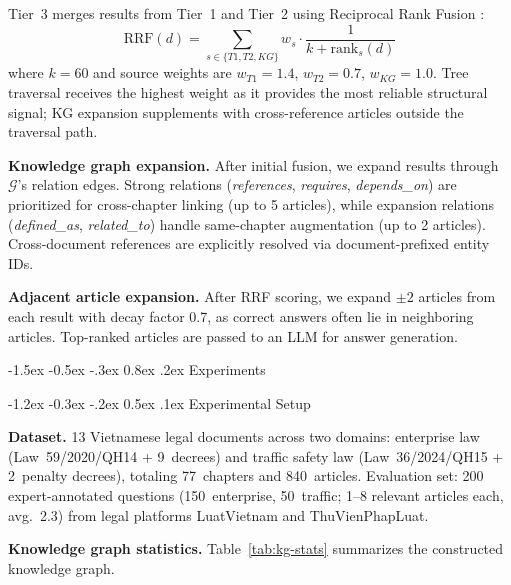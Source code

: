 \documentclass{IOS-Book-Article}
\makeatletter
\renewcommand\section{\@startsection{section}{1}{\z@}%
  {-1.5ex \@plus -0.5ex \@minus -.3ex}%
  {0.8ex \@plus .2ex}%
  {\normalfont\large\bfseries}}
\renewcommand\subsection{\@startsection{subsection}{2}{\z@}%
  {-1.2ex \@plus -0.3ex \@minus -.2ex}%
  {0.5ex \@plus .1ex}%
  {\normalfont\normalsize\bfseries}}
\makeatother
\begin{document}
Tier~3 merges results from Tier~1 and Tier~2 using Reciprocal Rank Fusion \cite{r28}:
\begin{equation}
\text{RRF}(d) = \sum_{s \in \{T1, T2, KG\}} w_s \cdot \frac{1}{k + \text{rank}_s(d)}
\end{equation}
where $k=60$ and source weights are $w_{T1}=1.4$, $w_{T2}=0.7$, $w_{KG}=1.0$. Tree traversal receives the highest weight as it provides the most reliable structural signal; KG expansion supplements with cross-reference articles outside the traversal path.

\textbf{Knowledge graph expansion.} After initial fusion, we expand results through $\mathcal{G}$'s relation edges. Strong relations (\textit{references}, \textit{requires}, \textit{depends\_on}) are prioritized for cross-chapter linking (up to 5 articles), while expansion relations (\textit{defined\_as}, \textit{related\_to}) handle same-chapter augmentation (up to 2 articles). Cross-document references are explicitly resolved via document-prefixed entity IDs.

\textbf{Adjacent article expansion.} After RRF scoring, we expand $\pm 2$ articles from each result with decay factor 0.7, as correct answers often lie in neighboring articles. Top-ranked articles are passed to an LLM for answer generation.

\section{Experiments}
\label{sec:experiments}

\subsection{Experimental Setup}

\textbf{Dataset.} 13 Vietnamese legal documents across two domains: enterprise law (Law~59/2020/QH14 + 9~decrees) and traffic safety law (Law~36/2024/QH15 + 2~penalty decrees), totaling 77~chapters and 840~articles. Evaluation set: 200 expert-annotated questions (150~enterprise, 50~traffic; 1--8 relevant articles each, avg.~2.3) from legal platforms LuatVietnam and ThuVienPhapLuat.

\textbf{Knowledge graph statistics.} Table~\ref{tab:kg-stats} summarizes the constructed knowledge graph.
\end{document}
